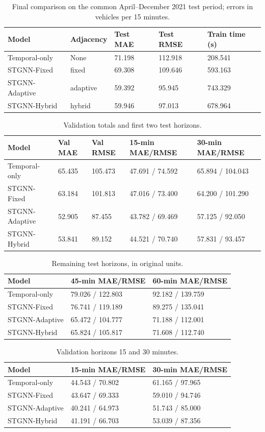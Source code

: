 \documentclass[11pt,a4paper]{article}
\begin{document}
\begin{table}[htbp]\centering\small\caption{Final comparison on the common April–December 2021 test period; errors in vehicles per 15 minutes.}\begin{tabular}{lllll}\toprule
Model & Adjacency & Test MAE & Test RMSE & Train time (s)\\\midrule
Temporal-only & None & 71.198 & 112.918 & 208.541\\
STGNN-Fixed & fixed & 69.308 & 109.646 & 593.163\\
STGNN-Adaptive & adaptive & 59.392 & 95.945 & 743.329\\
STGNN-Hybrid & hybrid & 59.946 & 97.013 & 678.964\\
\bottomrule\end{tabular}\end{table}
\begin{table}[htbp]\centering\small\caption{Validation totals and first two test horizons.}\begin{tabular}{lllll}\toprule
Model & Val MAE & Val RMSE & 15-min MAE/RMSE & 30-min MAE/RMSE\\\midrule
Temporal-only & 65.435 & 105.473 & 47.691 / 74.592 & 65.894 / 104.043\\
STGNN-Fixed & 63.184 & 101.813 & 47.016 / 73.400 & 64.200 / 101.290\\
STGNN-Adaptive & 52.905 & 87.455 & 43.782 / 69.469 & 57.125 / 92.050\\
STGNN-Hybrid & 53.841 & 89.152 & 44.521 / 70.740 & 57.831 / 93.457\\
\bottomrule\end{tabular}\end{table}
\begin{table}[htbp]\centering\small\caption{Remaining test horizons, in original units.}\begin{tabular}{lll}\toprule
Model & 45-min MAE/RMSE & 60-min MAE/RMSE\\\midrule
Temporal-only & 79.026 / 122.803 & 92.182 / 139.759\\
STGNN-Fixed & 76.741 / 119.189 & 89.275 / 135.041\\
STGNN-Adaptive & 65.472 / 104.777 & 71.188 / 112.001\\
STGNN-Hybrid & 65.824 / 105.817 & 71.608 / 112.740\\
\bottomrule\end{tabular}\end{table}
\begin{table}[htbp]\centering\small\caption{Validation horizons 15 and 30 minutes.}\begin{tabular}{lll}\toprule
Model & 15-min MAE/RMSE & 30-min MAE/RMSE\\\midrule
Temporal-only & 44.543 / 70.802 & 61.165 / 97.965\\
STGNN-Fixed & 43.647 / 69.333 & 59.010 / 94.746\\
STGNN-Adaptive & 40.241 / 64.973 & 51.743 / 85.000\\
STGNN-Hybrid & 41.191 / 66.703 & 53.039 / 87.356\\
\bottomrule\end{tabular}\end{table}
\end{document}
